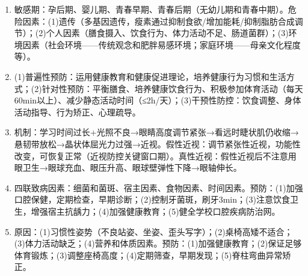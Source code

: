 {\begin{enumerate}[leftmargin=*, itemsep=5pt]
    \item 敏感期：孕后期、婴儿期、青春早期、青春后期（无幼儿期和青春中期）。危险因素：(1)遗传（多基因遗传，瘦素通过抑制食欲/增加能耗/抑制脂肪合成调节）；(2)个人因素（膳食摄入、饮食行为、体力活动不足、肠道菌群）；(3)环境因素（社会环境——传统观念和肥胖易感环境；家庭环境——母亲文化程度等）。

    \item (1)普遍性预防：运用健康教育和健康促进理论，培养健康行为习惯和生活方式；(2)针对性预防：平衡膳食、培养健康饮食行为、积极参加体育活动（每天60min以上）、减少静态活动时间（≤2h/天）；(3)干预性防控：饮食调整、身体活动指导、行为矫正、心理疏导。

    \item 机制：学习时间过长+光照不良→眼睛高度调节紧张→看远时睫状肌仍收缩→悬韧带放松→晶状体屈光力过强→近视。假性近视：调节紧张性近视，功能性改变，可恢复正常（近视防控关键窗口期）。真性近视：假性近视后不注意用眼卫生→眼球充血、眼压升高、眼球壁弹性下降→眼轴伸长。

    \item 四联致病因素：细菌和菌斑、宿主因素、食物因素、时间因素。预防：(1)加强口腔保健，定期检查，早期诊断；(2)控制牙菌斑，刷牙3min；(3)注意饮食卫生，增强宿主抗龋力；(4)加强健康教育；(5)健全学校口腔疾病防治网。

    \item 原因：(1)习惯性姿势（不良站姿、坐姿、歪头写字）；(2)桌椅高矮不适合；(3)体力活动缺乏；(4)营养和体质因素。预防：(1)加强健康教育；(2)保证足够体育锻炼；(3)调整座椅高度；(4)定期筛查，早期发现；(5)脊柱弯曲异常矫正。
\end{enumerate}
}

\newpage
